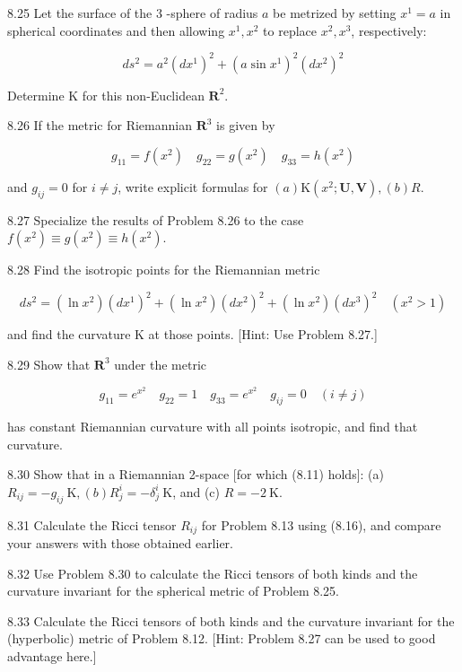 \documentclass[10pt]{article}
\begin{document}
8.25 Let the surface of the 3 -sphere of radius $a$ be metrized by setting $x^{1}=a$ in spherical coordinates and then allowing $x^{1}, x^{2}$ to replace $x^{2}, x^{3}$, respectively:

$$
d s^{2}=a^{2}\left(d x^{1}\right)^{2}+\left(a \sin x^{1}\right)^{2}\left(d x^{2}\right)^{2}
$$

Determine $\mathrm{K}$ for this non-Euclidean $\mathbf{R}^{2}$.

8.26 If the metric for Riemannian $\mathbf{R}^{3}$ is given by

$$
g_{11}=f\left(x^{2}\right) \quad g_{22}=g\left(x^{2}\right) \quad g_{33}=h\left(x^{2}\right)
$$

and $g_{i j}=0$ for $i \neq j$, write explicit formulas for $(a) \mathrm{K}\left(x^{2} ; \mathbf{U}, \mathbf{V}\right),(b) R$.

8.27 Specialize the results of Problem 8.26 to the case $f\left(x^{2}\right) \equiv g\left(x^{2}\right) \equiv h\left(x^{2}\right)$.

8.28 Find the isotropic points for the Riemannian metric

$$
d s^{2}=\left(\ln x^{2}\right)\left(d x^{1}\right)^{2}+\left(\ln x^{2}\right)\left(d x^{2}\right)^{2}+\left(\ln x^{2}\right)\left(d x^{3}\right)^{2} \quad\left(x^{2}>1\right)
$$

and find the curvature $\mathrm{K}$ at those points. [Hint: Use Problem 8.27.]

8.29 Show that $\mathbf{R}^{3}$ under the metric

$$
g_{11}=e^{x^{2}} \quad g_{22}=1 \quad g_{33}=e^{x^{2}} \quad g_{i j}=0 \quad(i \neq j)
$$

has constant Riemannian curvature with all points isotropic, and find that curvature.

8.30 Show that in a Riemannian 2-space [for which (8.11) holds]: (a) $R_{i j}=-g_{i j} \mathrm{~K},(b) R_{j}^{i}=-\delta_{j}^{i} \mathrm{~K}$, and (c) $R=-2 \mathrm{~K}$.

8.31 Calculate the Ricci tensor $R_{i j}$ for Problem 8.13 using (8.16), and compare your answers with those obtained earlier.

8.32 Use Problem 8.30 to calculate the Ricci tensors of both kinds and the curvature invariant for the spherical metric of Problem 8.25.

8.33 Calculate the Ricci tensors of both kinds and the curvature invariant for the (hyperbolic) metric of Problem 8.12. [Hint: Problem 8.27 can be used to good advantage here.]
\end{document}
